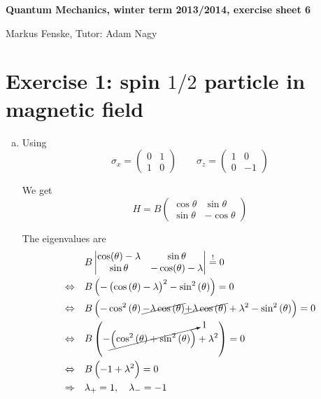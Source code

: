 \documentclass[a4paper,german,12pt,smallheadings]{scrartcl}
\begin{document}
\begin{center}
\bfseries %
\sffamily %
\vspace{-40pt}
Quantum Mechanics, winter term 2013/2014, exercise sheet 6

Markus Fenske, Tutor: Adam Nagy
\vspace{-10pt}
\end{center}

\section*{Exercise 1: spin $1/2$ particle in magnetic field}
\begin{enumerate}[a)]
  \item
    Using
    \begin{equation*}
    \sigma_x = \begin{pmatrix}0 & 1 \\ 1 & 0\end{pmatrix} \qquad \sigma_z = \begin{pmatrix}1 & 0 \\ 0 & -1\end{pmatrix}
    \end{equation*}

    We get
    \begin{equation*}
    H = B \begin{pmatrix} \cos \theta & \sin \theta \\ \sin \theta & -\cos \theta \end{pmatrix}
    \end{equation*}

    The eigenvalues are
    \begin{align*}
    &B \begin{vmatrix} \cos(\theta) - \lambda & \sin \theta \\ \sin \theta & -\cos(\theta) - \lambda \end{vmatrix} \overset{!}{=} 0 \\
      \Leftrightarrow\quad&B \del{-\del{\cos\del{\theta} - \lambda}^2-\sin^2\del{\theta}}  = 0\\
      \Leftrightarrow\quad&B \del{-\cos^2\del\theta \cancel{-\lambda\cos\del\theta}\cancel{+\lambda\cos\del\theta}+\lambda^2-\sin^2\del\theta} = 0\\
      \Leftrightarrow\quad&B \del{-\cancelto{1}{\del{\cos^2\del\theta+\sin^2\del\theta}}+\lambda^2} = 0\\
      \Leftrightarrow\quad&B \del{-1+\lambda^2} = 0\\
      \Rightarrow\quad &\lambda_+ = 1,\quad \lambda_- = -1
    \end{align*}


\end{enumerate}
\end{document}
